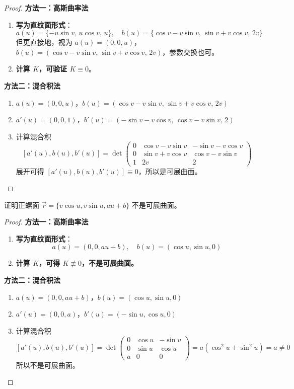 \documentclass[lang=cn,10pt,thmcnt=section]{elegantbook}
\begin{document}
\begin{proof}
	\textbf{方法一：高斯曲率法}
	
	\begin{enumerate}
		\item \textbf{写为直纹面形式}：
		\[
		a(u) = \{-u\sin v,\, u\cos v,\, u\},\quad b(u) = \{\cos v - v\sin v,\, \sin v + v\cos v,\, 2v\}
		\]
		但更直接地，视为 $a(u) = (0,0,u)$，$b(u) = (\cos v - v\sin v,\, \sin v + v\cos v,\, 2v)$，参数交换也可。
		\item \textbf{计算 $K$，可验证 $K \equiv 0$}。
	\end{enumerate}
	
	\textbf{方法二：混合积法}
	
	\begin{enumerate}
		\item $a(u) = (0,0,u)$，$b(u) = (\cos v - v\sin v,\, \sin v + v\cos v,\, 2v)$
		\item $a'(u) = (0,0,1)$，$b'(u) = (-\sin v - v\cos v,\, \cos v - v\sin v,\, 2)$
		\item 计算混合积
		\[
		[a'(u), b(u), b'(u)] = \det
		\begin{pmatrix}
		0 & \cos v - v\sin v & -\sin v - v\cos v \\
		0 & \sin v + v\cos v & \cos v - v\sin v \\
		1 & 2v & 2
		\end{pmatrix}
		\]
		展开可得 $[a'(u), b(u), b'(u)] \equiv 0$，所以是可展曲面。
	\end{enumerate}
	\end{proof}
\begin{example}
	证明正螺面 $\vec{r} = \{v\cos u, v\sin u, au + b\}$ 不是可展曲面。

\end{example}
\begin{proof}
	\textbf{方法一：高斯曲率法}
	
	\begin{enumerate}
		\item \textbf{写为直纹面形式}：
		\[
		a(u) = (0, 0, au + b),\quad b(u) = (\cos u, \sin u, 0)
		\]
		\item \textbf{计算 $K$，可得 $K \not\equiv 0$，不是可展曲面。}
	\end{enumerate}
	
	\textbf{方法二：混合积法}
	
	\begin{enumerate}
		\item $a(u) = (0, 0, au + b)$，$b(u) = (\cos u, \sin u, 0)$
		\item $a'(u) = (0, 0, a)$，$b'(u) = (-\sin u, \cos u, 0)$
		\item 计算混合积
		\[
		[a'(u), b(u), b'(u)] = \det
		\begin{pmatrix}
		0 & \cos u & -\sin u \\
		0 & \sin u & \cos u \\
		a & 0 & 0
		\end{pmatrix}
		= a(\cos^2 u + \sin^2 u) = a \neq 0
		\]
		所以不是可展曲面。
	\end{enumerate}
	\end{proof}
\end{document}
